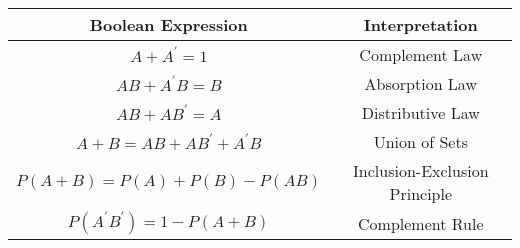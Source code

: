 \begin{tabular}[12pt]{ |c| c|} 
    \hline
    {Boolean Expression} & {Interpretation}\\ 
    \hline
    $A + A^\prime = 1$ & Complement Law\\
    \hline
    $AB + A^\prime B = B$ & Absorption Law\\
    \hline
    $AB + AB^\prime = A$ & Distributive Law\\
    \hline
    $A + B = AB + AB^\prime + A^\prime B$ & Union of Sets\\
    \hline
    $P(A + B) = P(A) + P(B) - P(AB)$ & Inclusion-Exclusion Principle\\
    \hline
    $P(A^\prime B^\prime) = 1 - P(A + B)$ & Complement Rule\\
    \hline
\end{tabular}

